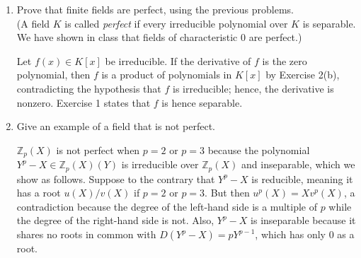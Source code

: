 \documentclass[12pt]{article}
\newcommand{\ZZ}{\mathbb{Z}}
\begin{document}
\begin{enumerate}
    \item Prove that finite fields are perfect, using the previous problems. \\ (A field $K$ is called {\em perfect} if every irreducible polynomial over $K$ is separable.  We have shown in class that fields of characteristic $0$ are perfect.) \par
        Let $f(x) \in K[x]$ be irreducible. If the derivative of $f$ is the zero polynomial, then $f$ is a product of polynomials in $K[x]$ by Exercise 2(b), contradicting the hypothesis that $f$ is irreducible; hence, the derivative is nonzero. Exercise 1 states that $f$ is hence separable.

    \item Give an example of a field that is not perfect. \par
        $\ZZ_p(X)$ is not perfect when $p = 2$ or $p = 3$ because the polynomial $Y^p - X \in \ZZ_p(X)(Y)$ is irreducible over $\ZZ_p(X)$ and inseparable, which we show as follows. Suppose to the contrary that $Y^p - X$ is reducible, meaning it has a root $u(X)/v(X)$ if $p = 2$ or $p = 3$. But then $u^p(X) = Xv^p(X)$, a contradiction because the degree of the left-hand side is a multiple of $p$ while the degree of the right-hand side is not. Also, $Y^p - X$ is inseparable because it shares no roots in common with $D(Y^p - X) = pY^{p - 1}$, which has only 0 as a root.


\end{enumerate}
\end{document}
